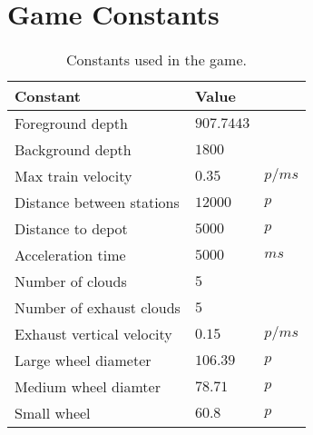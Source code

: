 \chapter{Game Constants}

\begin{table}[H]
\centering
\begin{tabular}{| l | l l |}
\hline
\textbf{Constant} & \textbf{Value} & \\
\hline
Foreground depth & $907.7443$ &\\
Background depth & $1800$ &\\
Max train velocity & $0.35$ & $p/ms$\\
Distance between stations & $12000$ & $p$\\
Distance to depot & $5000$ & $p$\\
Acceleration time & $5000$ & $ms$\\
Number of clouds & $5$ &\\
Number of exhaust clouds & $5$ &\\
Exhaust vertical velocity & $0.15$ & $p/ms$\\
Large wheel diameter & $106.39$ & $p$\\
Medium wheel diamter & $78.71$ & $p$\\
Small wheel & $60.8$ & $p$\\
\hline
\end{tabular}
\label{tab:constants}
\caption{Constants used in the game.}
\end{table}
